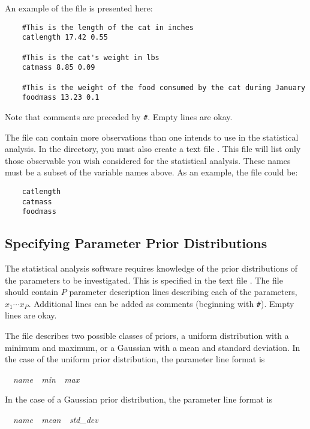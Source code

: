 An example of the  file is presented here:

\begin{verbatim}
    #This is the length of the cat in inches
    catlength 17.42 0.55

    #This is the cat's weight in lbs
    catmass 8.85 0.09

    #This is the weight of the food consumed by the cat during January
    foodmass 13.23 0.1
\end{verbatim}

Note that comments are preceded by \verb+#+. Empty lines are okay.

The  file can contain more observations than one intends to use in the statistical analysis. In the  directory, you must also create a text file . This file will list only those observable you wish considered for the statistical analysis. These names must be a subset of the variable names above. As an example, the file could be:

\begin{verbatim}
    catlength
    catmass
    foodmass
\end{verbatim}

\subsection{Specifying Parameter Prior Distributions}

The statistical analysis software requires knowledge of the prior distributions of the parameters to be investigated. This is specified in the text file . The file should contain $P$ parameter description lines describing each of the parameters, $x_1\cdots x_P$. Additional lines can be added as comments (beginning with \verb+#+). Empty lines are okay.

The  file describes two possible classes of priors, a uniform distribution with a minimum and maximum, or a Gaussian with a mean and standard deviation. In the case of the uniform prior distribution, the parameter line format is

\hspace*{20pt}{\tt uniform}~~{\it name~~min~~max}

In the case of a Gaussian prior distribution, the parameter line format is

\hspace*{20pt}{\tt gaussian}~~{\it name~~mean~~std\_dev}

